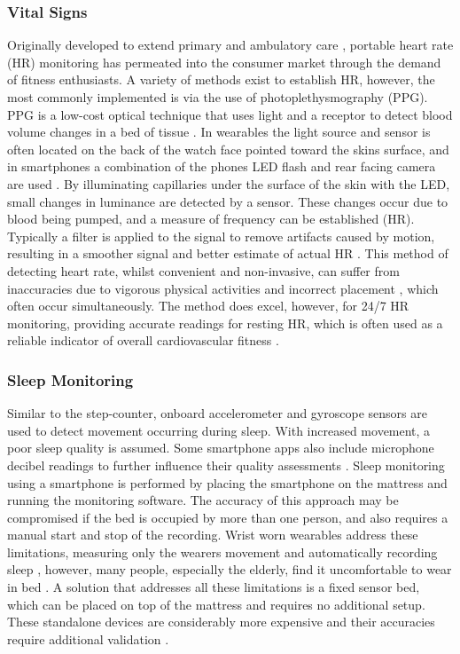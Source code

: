 \subsubsection{Vital Signs}
Originally developed to extend primary and ambulatory care \cite{HOLTER1949}, portable heart rate (HR) monitoring has permeated into the consumer market through the demand of fitness enthusiasts. A variety of methods exist to establish HR, however, the most commonly implemented is via the use of photoplethysmography (PPG). PPG is a low-cost optical technique that uses light and a receptor to detect blood volume changes in a bed of tissue \cite{Allen2007}. In wearables the light source and sensor is often located on the back of the watch face pointed toward the skins surface, and in smartphones a combination of the phones LED flash and rear facing camera are used \cite{Asada2003}. By illuminating capillaries under the surface of the skin with the LED, small changes in luminance are detected by a sensor. These changes occur due to blood being pumped, and a measure of frequency can be established (HR). Typically a filter is applied to the signal to remove artifacts caused by motion, resulting in a smoother signal and better estimate of actual HR \cite{Chan2002}. This method of detecting heart rate, whilst convenient and non-invasive, can suffer from inaccuracies due to vigorous physical activities and incorrect placement \cite{Parak2014}, which often occur simultaneously. The method does excel, however, for 24/7 HR monitoring, providing accurate readings for resting HR, which is often used as a reliable indicator of overall cardiovascular fitness \cite{Mukhopadhyay2015, Steinhubl2015}.

\subsubsection{Sleep Monitoring}
Similar to the step-counter, onboard accelerometer and gyroscope sensors are used to detect movement occurring during sleep. With increased movement, a poor sleep quality is assumed. Some smartphone apps also include microphone decibel readings to further influence their quality assessments \cite{Calikli2014}. Sleep monitoring using a smartphone is performed by placing the smartphone on the mattress and running the monitoring software. The accuracy of this approach may be compromised if the bed is occupied by more than one person, and also requires a manual start and stop of the recording. Wrist worn wearables address these limitations, measuring only the wearers movement and automatically recording sleep \cite{VanHees2015}, however, many people, especially the elderly, find it uncomfortable to wear in bed \cite{Fisher2015}. A solution that addresses all these limitations is a fixed sensor bed, which can be placed on top of the mattress and requires no additional setup. These standalone devices are considerably more expensive and their accuracies require additional validation \cite{Ko2015}.


